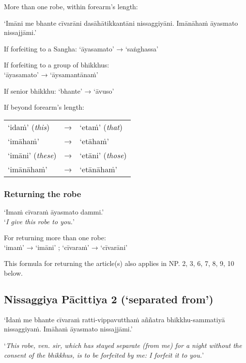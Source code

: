 More than one robe, within forearm's length:

‘Imāni me bhante cīvarāni dasāhātikkantāni nissaggiyāni. Imānāhaṁ āyasmato nissajjāmi.’

If forfeiting to a Sangha: ‘āyasamato’ → ‘saṅghassa’ 

If forfeiting to a group of bhikkhus:\\
‘āyasamato’ → ‘āysamantānaṁ’

If senior bhikkhu: ‘bhante’ → ‘āvuso’

If beyond forearm's length:

\begin{tabular}{@{}lll@{}}
‘idaṁ’ (\emph{this}) & → & ‘etaṁ’ (\emph{that})\\
‘imāhaṁ’             & → & ‘etāhaṁ’\\
‘imāni’ (\emph{these}) & → & ‘etāni’ (\emph{those})\\
‘imānāhaṁ’             & → & ‘etānāhaṁ’\\
\end{tabular}

\ifhandbookedition
\vspace*{-0.5\baselineskip}

\enlargethispage{\baselineskip}
\fi

\subsubsection{Returning the robe}
\label{np-1-returning-the-robe}

‘Imaṁ cīvaraṁ āyasmato dammi.’\\
‘\emph{I give this robe to you.}’ 

For returning more than one robe:\\
‘imaṁ’ → ‘imāni’ ; ‘cīvaraṁ’ → ‘cīvarāni’

This formula for returning the article(s) also applies in NP. 2, 3, 6, 7, 8, 9,
10 below.

\subsection[NP 2 (‘separated from’)]{Nissaggiya Pācittiya 2 (‘separated from’)}

‘Idaṁ me bhante cīvaraṁ ratti-vippavutthaṁ aññatra bhikkhu-sammatiyā
nissaggiyaṁ. Imāhaṁ āyasmato nissajjāmi.’

‘\emph{This robe, ven. sir, which has stayed separate (from me) for a night
  without the consent of the bhikkhus, is to be forfeited by me: I forfeit it to
  you.}’ 


